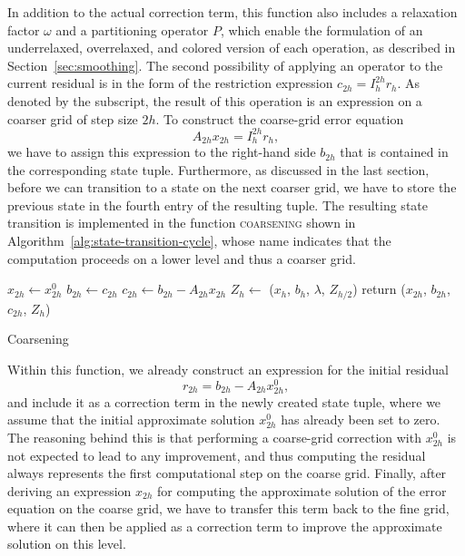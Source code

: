In addition to the actual correction term, this function also includes a relaxation factor $\omega$ and a partitioning operator $P$, which enable the formulation of an underrelaxed, overrelaxed, and colored version of each operation, as described in Section~\ref{sec:smoothing}.
The second possibility of applying an operator to the current residual is in the form of the restriction expression $c_{2h} = I_{h}^{2h} r_h$.
As denoted by the subscript, the result of this operation is an expression on a coarser grid of step size $2h$.
To construct the coarse-grid error equation 
\begin{equation*}
A_{2h} x_{2h} = I_{h}^{2h} r_h,
\end{equation*} 
we have to assign this expression to the right-hand side $b_{2h}$ that is contained in the corresponding state tuple.
Furthermore, as discussed in the last section, before we can transition to a state on the next coarser grid, we have to store the previous state in the fourth entry of the resulting tuple.
The resulting state transition is implemented in the function \textsc{coarsening} shown in Algorithm~\ref{alg:state-transition-cycle}, whose name indicates that the computation proceeds on a lower level and thus a coarser grid.
\begin{algorithm}[h]
	\begin{algorithmic}
		\State $x_{2h} \gets x_{2h}^0$ 
		\State $b_{2h} \gets c_{2h}$
		\State $c_{2h} \gets b_{2h} - A_{2h} x_{2h}$ 
		\State $Z_h \gets$ ($x_{h}$, $b_{h}$, $\lambda$, $Z_{h/2}$)
		\State return ($x_{2h}$, $b_{2h}$, $c_{2h}$, $Z_h$)
	\EndFunction
	\end{algorithmic}
 \caption{Coarsening}
\label{alg:state-transition-cycle}
\end{algorithm}
Within this function, we already construct an expression for the initial residual
\begin{equation*}
	r_{2h} = b_{2h} - A_{2h} x_{2h}^0,
\end{equation*} 
and include it as a correction term in the newly created state tuple, where we assume that the initial approximate solution $x^0_{2h}$ has already been set to zero.
The reasoning behind this is that performing a coarse-grid correction with $x^0_{2h}$ is not expected to lead to any improvement, and thus computing the residual always represents the first computational step on the coarse grid.
Finally, after deriving an expression $x_{2h}$ for computing the approximate solution of the error equation on the coarse grid, we have to transfer this term back to the fine grid, where it can then be applied as a correction term to improve the approximate solution on this level.
